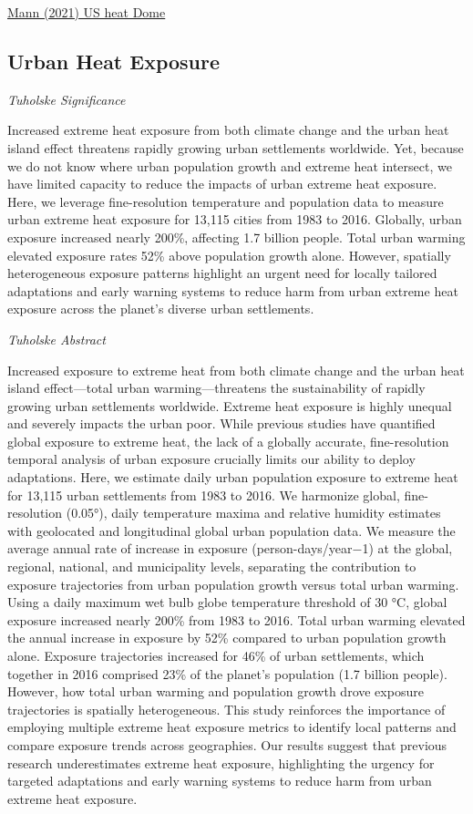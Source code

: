 \documentclass[
]{book}
\begin{document}
\href{https://www.nytimes.com/2021/06/29/opinion/heat-dome-climate-change.html}{Mann (2021) US heat Dome}

\hypertarget{urban-heat-exposure}{%
\subsection{Urban Heat Exposure}\label{urban-heat-exposure}}

\emph{Tuholske Significance}

Increased extreme heat exposure from both climate change and the urban heat island effect threatens rapidly growing urban settlements worldwide. Yet, because we do not know where urban population growth and extreme heat intersect, we have limited capacity to reduce the impacts of urban extreme heat exposure. Here, we leverage fine-resolution temperature and population data to measure urban extreme heat exposure for 13,115 cities from 1983 to 2016. Globally, urban exposure increased nearly 200\%, affecting 1.7 billion people. Total urban warming elevated exposure rates 52\% above population growth alone. However, spatially heterogeneous exposure patterns highlight an urgent need for locally tailored adaptations and early warning systems to reduce harm from urban extreme heat exposure across the planet's diverse urban settlements.

\emph{Tuholske Abstract}

Increased exposure to extreme heat from both climate change and the urban heat island effect---total urban warming---threatens the sustainability of rapidly growing urban settlements worldwide. Extreme heat exposure is highly unequal and severely impacts the urban poor. While previous studies have quantified global exposure to extreme heat, the lack of a globally accurate, fine-resolution temporal analysis of urban exposure crucially limits our ability to deploy adaptations. Here, we estimate daily urban population exposure to extreme heat for 13,115 urban settlements from 1983 to 2016. We harmonize global, fine-resolution (0.05°), daily temperature maxima and relative humidity estimates with geolocated and longitudinal global urban population data. We measure the average annual rate of increase in exposure (person-days/year−1) at the global, regional, national, and municipality levels, separating the contribution to exposure trajectories from urban population growth versus total urban warming. Using a daily maximum wet bulb globe temperature threshold of 30 °C, global exposure increased nearly 200\% from 1983 to 2016. Total urban warming elevated the annual increase in exposure by 52\% compared to urban population growth alone. Exposure trajectories increased for 46\% of urban settlements, which together in 2016 comprised 23\% of the planet's population (1.7 billion people). However, how total urban warming and population growth drove exposure trajectories is spatially heterogeneous. This study reinforces the importance of employing multiple extreme heat exposure metrics to identify local patterns and compare exposure trends across geographies. Our results suggest that previous research underestimates extreme heat exposure, highlighting the urgency for targeted adaptations and early warning systems to reduce harm from urban extreme heat exposure.
\end{document}
